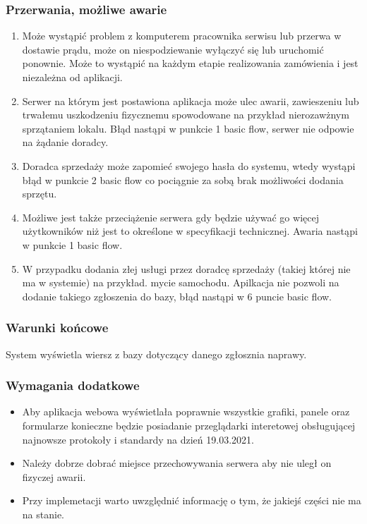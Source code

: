 \documentclass{article}
\begin{document}
\subsubsection{Przerwania, możliwe awarie}
\begin{enumerate}
    \item Może wystąpić problem z komputerem pracownika serwisu lub przerwa w dostawie prądu, może on niespodziewanie wyłączyć się lub uruchomić ponownie. Może to wystąpić na każdym etapie realizowania zamówienia i jest niezależna od aplikacji.
    \item Serwer na którym jest postawiona aplikacja może ulec awarii, zawieszeniu lub trwałemu uszkodzeniu fizycznemu spowodowane na przykład nierozawżnym sprzątaniem lokalu. Błąd nastąpi w punkcie 1 basic flow, serwer nie odpowie na żądanie doradcy.
    \item Doradca sprzedaży może zapomieć swojego hasła do systemu, wtedy wystąpi błąd w punkcie 2 basic flow co pociągnie za sobą brak możliwości dodania sprzętu.
    \item Możliwe jest także przeciążenie serwera gdy będzie używać go więcej użytkowników niż jest to określone w specyfikacji technicznej. Awaria nastąpi w punkcie 1 basic flow.
    \item W przypadku dodania złej usługi przez doradcę sprzedaży (takiej której nie ma w systemie) na przykład. mycie samochodu. Apilkacja nie pozwoli na dodanie takiego zgłoszenia do bazy, błąd nastąpi w 6 puncie basic flow.
\end{enumerate}
\subsubsection{Warunki końcowe}
System wyświetla wiersz z bazy dotyczący danego zgłosznia naprawy.
\subsubsection{Wymagania dodatkowe}
\begin{itemize}
    \item Aby aplikacja webowa wyświetlała poprawnie wszystkie grafiki, panele oraz formularze konieczne będzie posiadanie przeglądarki interetowej obsługującej najnowsze protokoły i standardy na dzień 19.03.2021.
    \item Należy dobrze dobrać miejsce przechowywania serwera aby nie uległ on fizyczej awarii.
    \item Przy implemetacji warto uwzględnić informację o tym, że jakiejś części nie ma na stanie.
\end{itemize}
\end{document}
